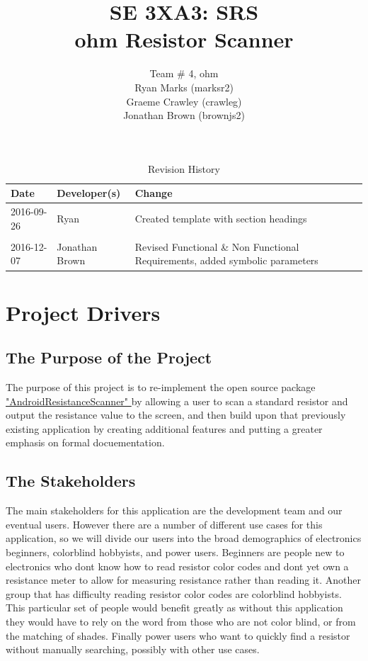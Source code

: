 \documentclass{article}
\title{SE 3XA3: SRS\\ohm Resistor Scanner}
\author{Team \# 4, ohm
		\\ Ryan Marks (marksr2)
		\\ Graeme Crawley (crawleg)
		\\ Jonathan Brown (brownjs2)
}
\date{}
\begin{document}
\maketitle

\newpage

\begin{table}[hp]
\caption{Revision History} \label{TblRevisionHistory}
\begin{tabularx}{\textwidth}{llX}
\toprule
\textbf{Date} & \textbf{Developer(s)} & \textbf{Change}\\
\midrule
2016-09-26 & Ryan & Created template with section headings\\ \\
2016-12-07 & Jonathan Brown & Revised Functional \& Non Functional Requirements, added symbolic parameters\\
\bottomrule
\end{tabularx}
\end{table}

\newpage

\tableofcontents

\listoffigures
 
\listoftables

\newpage

\section{Project Drivers}

\subsection{The Purpose of the Project }
The purpose of this project is to re-implement the open source package \href{https://github.com/sumeetkr/AndroidResistorScanner}{ "AndroidResistanceScanner" } by allowing a user to scan a standard resistor and output the resistance value to the screen, and then build upon that previously existing application by creating additional features and putting a greater emphasis on formal docuementation.

\subsection{The Stakeholders}
The main stakeholders for this application are the development team and our eventual users. However there are a number of different use cases for this application, so we will divide our users into the broad demographics of electronics beginners, colorblind hobbyists, and power users. Beginners are people new to electronics who dont know how to read resistor color codes and dont yet own a resistance meter to allow for measuring resistance rather than reading it. Another group that has difficulty reading resistor color codes are colorblind hobbyists. This particular set of people would benefit greatly as without this application they would have to rely on the word from those who are not color blind, or from the matching of shades. Finally power users who want to quickly find a resistor without manually searching, possibly with other use cases.
\end{document}

